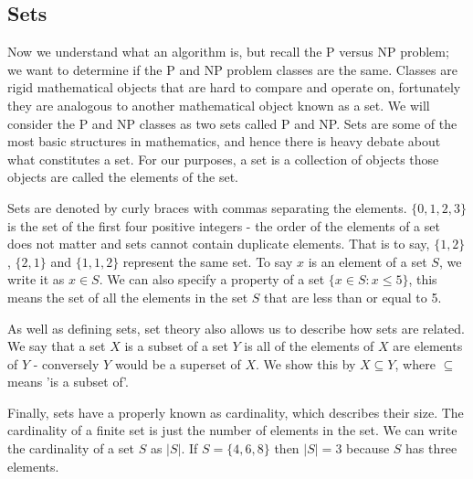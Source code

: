 \documentclass[twoside,10pt]{article}
\begin{document}
\subsection{Sets}
Now we understand what an algorithm is, but recall the P versus NP problem; we want to determine if the P and NP problem classes are the same. Classes are rigid mathematical objects that are hard to compare and operate on, fortunately they are analogous to another mathematical object known as a set. We will consider the P and NP classes as two sets called P and NP. Sets are some of the most basic structures in mathematics, and hence there is heavy debate about what constitutes a set. For our purposes, a set is a collection of objects those objects are called the elements of the set. 

Sets are denoted by curly braces with commas separating the elements. {$\{0,1,2,3\}$} is the set of the first four positive integers - the order of the elements of a set does not matter and sets cannot contain duplicate elements. That is to say, {$\{1,2\}$}, {$\{2,1\}$} and {$\{1,1,2\}$} represent the same set. To say $x$ is an element of a set $S$, we write it as $x\in S$. We can also specify a property of a set $\{x\in S:x\leq5\}$, this means the set of all the elements in the set $S$ that are less than or equal to 5.

As well as defining sets, set theory also allows us to describe how sets are related. We say that a set $X$ is a subset of a set $Y$ is all of the elements of $X$ are elements of $Y$ - conversely $Y$ would be a superset of $X$. We show this by $X\subseteq Y$, where $\subseteq$ means 'is a subset of'.

Finally, sets have a properly known as cardinality, which describes their size. The cardinality of a finite set is just the number of elements in the set. We can write the cardinality of a set $S$ as $\lvert S\rvert$. If $S=\{4,6,8\}$ then $\lvert S\rvert=3$ because $S$ has three elements.
\end{document}
